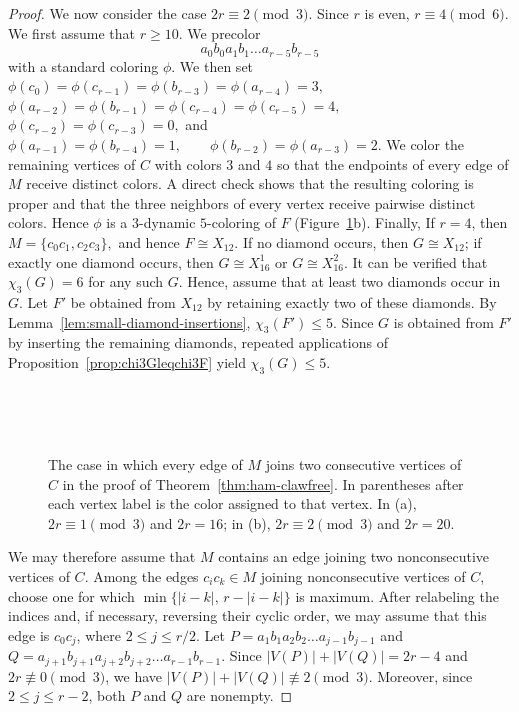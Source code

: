 \begin{proof}
We now consider the case $2r\equiv2\pmod3$. Since $r$ is even,
$r\equiv4\pmod6$. We first assume that $r\geq10$.
We precolor
\[
a_0b_0a_1b_1\ldots a_{r-5}b_{r-5}
\]
with a standard coloring $\phi$. We then set
$
\phi(c_0)=\phi(c_{r-1})=\phi(b_{r-3})
=\phi(a_{r-4})=3,
$
$
\phi(a_{r-2})=\phi(b_{r-1})
=\phi(c_{r-4})=\phi(c_{r-5})=4,
$
$
\phi(c_{r-2})=\phi(c_{r-3})=0,
$ and
$
\phi(a_{r-1})=\phi(b_{r-4})=1,
\qquad
\phi(b_{r-2})=\phi(a_{r-3})=2.
$
We color the remaining vertices of $C$ with colors $3$ and $4$ so that
the endpoints of every edge of $M$ receive distinct colors.
A direct check shows that the resulting coloring is proper and that the
three neighbors of every vertex receive pairwise distinct colors.
Hence $\phi$ is a $3$-dynamic $5$-coloring of $F$
(Figure~\ref{fig:cubic-consecutive}b).
Finally, If $r=4$, then
$
M=\{c_0c_1,c_2c_3\},
$
and hence $F\cong X_{12}$. If no diamond occurs, then
$G\cong X_{12}$; if exactly one diamond occurs, then
$G\cong X_{16}^1$ or $G\cong X_{16}^2$. It can be verified that $\chi_3(G)=6$ for any such $G$. Hence, assume that at least two diamonds occur in $G$.
Let $F'$ be obtained from $X_{12}$ by retaining exactly two of these
diamonds. By Lemma~\ref{lem:small-diamond-insertions},
$\chi_3(F')\leq5$. Since $G$ is obtained from $F'$ by inserting the
remaining diamonds, repeated applications of
Proposition~\ref{prop:chi3Gleqchi3F} yield $\chi_3(G)\leq5$.


\begin{figure}[H]
    \centering

    \begin{subfigure}{0.48\textwidth}
        \centering
        
        \caption{$ $}
    \end{subfigure}
    \hfill
    \begin{subfigure}{0.48\textwidth}
        \centering
        
        \caption{$ $}
    \end{subfigure}

  \caption{The case in which every edge of $M$ joins two consecutive
vertices of $C$ in the proof of Theorem~\ref{thm:ham-clawfree}.
In parentheses after each vertex label is the color assigned to that
vertex. In (a), $2r\equiv1\pmod3$ and $2r=16$; in (b),
$2r\equiv2\pmod3$ and $2r=20$.}
    \label{fig:cubic-consecutive}
\end{figure}

We may therefore assume that $M$ contains an edge joining two
nonconsecutive vertices of $C$.
Among the edges $c_ic_k\in M$ joining nonconsecutive vertices of $C$,
choose one for which
$
\min\{|i-k|,\,r-|i-k|\}
$
is maximum. After relabeling the indices and, if necessary, reversing
their cyclic order, we may assume that this edge is $c_0c_j$, where
$
2\leq j\leq r/2.
$
Let
$
P=a_1b_1a_2b_2\ldots a_{j-1}b_{j-1}
$
and
$
Q=a_{j+1}b_{j+1}a_{j+2}b_{j+2}\ldots
a_{r-1}b_{r-1}.
$
Since
$
|V(P)|+|V(Q)|=2r-4
$
and $2r\not\equiv0\pmod3$, we have
$
|V(P)|+|V(Q)|\not\equiv2\pmod3.
$
Moreover, since $2\leq j\leq r-2$, both $P$ and $Q$ are nonempty.


\end{proof}
